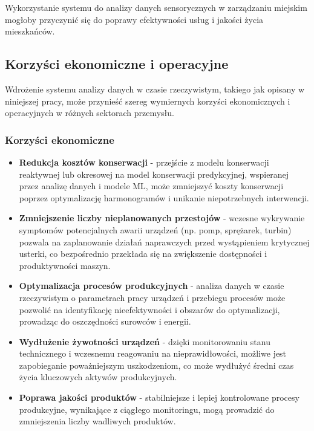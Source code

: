 Wykorzystanie systemu do analizy danych sensorycznych w zarządzaniu miejskim mogłoby przyczynić się do poprawy efektywności usług i jakości życia mieszkańców.

\subsection{Korzyści ekonomiczne i operacyjne}
\label{subsec:korzysci}

Wdrożenie systemu analizy danych w czasie rzeczywistym, takiego jak opisany w niniejszej pracy, może przynieść szereg wymiernych korzyści ekonomicznych i operacyjnych w różnych sektorach przemysłu.

\subsubsection{Korzyści ekonomiczne}
\label{subsubsec:korzysci_ekonomiczne}

\begin{itemize}
    \item \textbf{Redukcja kosztów konserwacji} - przejście z modelu konserwacji reaktywnej lub okresowej na model konserwacji predykcyjnej, wspieranej przez analizę danych i modele ML, może zmniejszyć koszty konserwacji poprzez optymalizację harmonogramów i unikanie niepotrzebnych interwencji.
    \item \textbf{Zmniejszenie liczby nieplanowanych przestojów} - wczesne wykrywanie symptomów potencjalnych awarii urządzeń (np. pomp, sprężarek, turbin) pozwala na zaplanowanie działań naprawczych przed wystąpieniem krytycznej usterki, co bezpośrednio przekłada się na zwiększenie dostępności i produktywności maszyn.
    \item \textbf{Optymalizacja procesów produkcyjnych} - analiza danych w czasie rzeczywistym o parametrach pracy urządzeń i przebiegu procesów może pozwolić na identyfikację nieefektywności i obszarów do optymalizacji, prowadząc do oszczędności surowców i energii.
    \item \textbf{Wydłużenie żywotności urządzeń} - dzięki monitorowaniu stanu technicznego i wczesnemu reagowaniu na nieprawidłowości, możliwe jest zapobieganie poważniejszym uszkodzeniom, co może wydłużyć średni czas życia kluczowych aktywów produkcyjnych.
    \item \textbf{Poprawa jakości produktów} - stabilniejsze i lepiej kontrolowane procesy produkcyjne, wynikające z ciągłego monitoringu, mogą prowadzić do zmniejszenia liczby wadliwych produktów.
\end{itemize}

